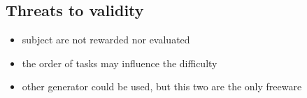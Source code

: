 	
	\subsection{Threats to validity}
	\begin{itemize}
		\item subject are not rewarded nor evaluated
		\item the order of tasks may influence the difficulty
		\item other generator could be used, but this two are the only freeware
	\end{itemize}